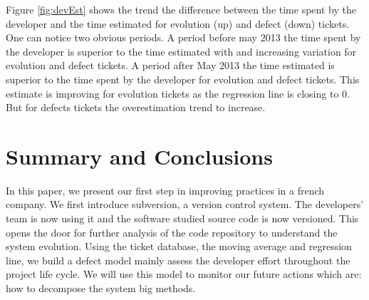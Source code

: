 \documentclass[10pt,conference]{IEEEtran}
\begin{document}
Figure \ref{fig:devEst} shows the trend the difference between the time spent by the developer and the time estimated for evolution (up) and defect (down) tickets.
One can notice two obvious periods. 
 A period before may 2013 the time spent by the developer is superior to the time estimated with and increasing variation for evolution and defect tickets. 
 A period after May 2013 the time estimated is superior to the time spent by the developer for evolution and defect tickets. 
 This estimate is improving for evolution tickets as the regression line is closing to 0.
But for defects tickets the overestimation trend to increase.



\section{Summary and Conclusions}
\label{sec:conclusion}

In this paper, we present our first step in improving practices in a french company. We first introduce subversion, a version control system.
The developers' team is now using it and the software studied source code is now versioned.
This opens the door for further analysis of the code repository to understand the system evolution. 
Using the ticket database, the moving average and regression line, we build a defect model mainly assess the developer effort throughout the project life cycle. We will use this model to monitor our future actions which are: how to decompose the system big methods.

%


\vspace{12pt}
\end{document}

